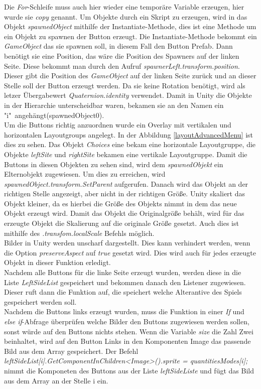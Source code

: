 Die \textit{For}-Schleife muss auch hier wieder eine temporäre Variable erzeugen, hier wurde sie \textit{copy} genannt. Um Objekte durch ein Skript zu erzeugen, wird in das Objekt \textit{spawnedObject} mithilfe der Instantiate-Methode, dies ist eine Methode um ein Objekt zu spawnen der Button erzeugt. Die Instantiate-Methode bekommt ein \textit{GameObject} das sie spawnen soll, in diesem Fall den Button Prefab. Dann benötigt sie eine Position, das wäre die Position des Spawners auf der linken Seite. Diese bekommt man durch den Aufruf \textit{spawnerLeft.transform.position}. Dieser gibt die Position des \textit{GameObject} auf der linken Seite zurück und an dieser Stelle soll der Button erzeugt werden. Da sie keine Rotation benötigt, wird als letzer Übergabewert \textit{Quaternion.identity} verwendet.
Damit in Unity die Objekte in der Hierarchie unterscheidbar waren, bekamen sie an den Namen ein "i"\ angehängt(spawnedObject0).\\
Um die Buttons richtig anzuordnen wurde ein Overlay mit vertikalen und horizontalen Layoutgroups angelegt. In der Abbildung \ref{layoutAdvancedMenu} ist dies zu sehen. Das Objekt \textit{Choices}  eine bekam eine horizontale Layoutgruppe, die Objekte \textit{leftSite} und \textit{rightSite} bekamen eine vertikale Layoutgruppe. 
Damit die Buttons in diesen Objekten zu sehen sind, wird dem \textit{spawnedObjekt} ein Elternobjekt zugewiesen. Um dies zu erreichen, wird \textit{spawnedObject.transform.SetParent} aufgerufen. Danach wird das Objekt an der richtigen Stelle angezeigt, aber nicht in der richtigen Größe. Unity skaliert das Objekt kleiner, da es hierbei die Größe des Objekts nimmt in dem das neue Objekt erzeugt wird. Damit das Objekt die Originalgröße behält, wird für das erzeugte Objekt die Skalierung auf die originale Größe gesetzt. Auch dies ist mithilfe des \textit{.transfom.localScale} Befehls möglich.\\
Bilder in Unity werden unscharf dargestellt. Dies kann verhindert werden, wenn die Option \textit{preserveAspect} auf \textit{true} gesetzt wird. Dies wird auch für jedes erzeugte Objekt in dieser Funktion erledigt.\\
Nachdem alle Buttons für die linke Seite erzeugt wurden, werden diese in die Liste \textit{LeftSideList} gespeichert und bekommen danach den Listener zugewiesen. Dieser ruft dann die Funktion auf, die speichert welche Alterantive des Spiels gespeichert werden soll.\\
Nachdem die Buttons links erzeugt wurden, muss die Funktion in einer \textit{If} und \textit{else if}-Abfrage überprüfen welche Bilder den Buttons zugewiesen werden sollen, sonst würde auf den Buttons nichts stehen. Wenn die Variable \textit{size} die Zahl Zwei beinhaltet, wird auf den Button Links in den Komponenten Image das passende Bild aus dem Array gespeichert. Der Befehl \textit{leftSideList[i].GetComponentInChildren<Image>().sprite = quantitiesModes[i];} nimmt die Komponeten des Buttons aus der Liste \textit{leftSideListe} und fügt das Bild aus dem Array an der Stelle i ein.\\
